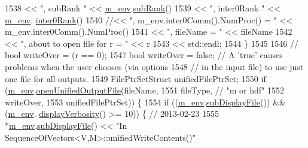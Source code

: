 \begin{DoxyCode}
1538                                   << \textcolor{stringliteral}{", subRank "}        << \hyperlink{class_q_u_e_s_o_1_1_base_vector_sequence_a8e8824d2a63c5a43bcc6473e3a0491e8}{m\_env}.\hyperlink{class_q_u_e_s_o_1_1_base_environment_a172d52f993f1322ed45aaddf71518dbb}{subRank}()
1539                                   << \textcolor{stringliteral}{", inter0Rank "}     << \hyperlink{class_q_u_e_s_o_1_1_base_vector_sequence_a8e8824d2a63c5a43bcc6473e3a0491e8}{m\_env}.
      \hyperlink{class_q_u_e_s_o_1_1_base_environment_ae106b5bb8a80b655b88b3a26b1e7c185}{inter0Rank}()
1540                                 \textcolor{comment}{//<< ", m\_env.inter0Comm().NumProc() = " << m\_env.inter0Comm().NumProc()}
1541                                   << \textcolor{stringliteral}{", fileName = "}     << fileName
1542                                   << \textcolor{stringliteral}{", about to open file for r = "} << r
1543                                   << std::endl;
1544         \}
1545 
1546         \textcolor{comment}{// bool writeOver = (r == 0);}
1547         \textcolor{keywordtype}{bool} writeOver = \textcolor{keyword}{false}; \textcolor{comment}{// A 'true' causes problems when the user chooses (via options}
1548                                 \textcolor{comment}{// in the input file) to use just one file for all outputs.}
1549         FilePtrSetStruct unifiedFilePtrSet;
1550         \textcolor{keywordflow}{if} (\hyperlink{class_q_u_e_s_o_1_1_base_vector_sequence_a8e8824d2a63c5a43bcc6473e3a0491e8}{m\_env}.\hyperlink{class_q_u_e_s_o_1_1_base_environment_ad4dd93dbcb8d2f9ef79af9afaec00aa5}{openUnifiedOutputFile}(fileName,
1551                                         fileType, \textcolor{comment}{// "m or hdf"}
1552                                         writeOver,
1553                                         unifiedFilePtrSet)) \{
1554           \textcolor{keywordflow}{if} ((\hyperlink{class_q_u_e_s_o_1_1_base_vector_sequence_a8e8824d2a63c5a43bcc6473e3a0491e8}{m\_env}.\hyperlink{class_q_u_e_s_o_1_1_base_environment_a8a0064746ae8dddfece4229b9ad374d6}{subDisplayFile}()) && (\hyperlink{class_q_u_e_s_o_1_1_base_vector_sequence_a8e8824d2a63c5a43bcc6473e3a0491e8}{m\_env}.
      \hyperlink{class_q_u_e_s_o_1_1_base_environment_a1fe5f244fc0316a0ab3e37463f108b96}{displayVerbosity}() >= 10)) \{ \textcolor{comment}{// 2013-02-23}
1555             *\hyperlink{class_q_u_e_s_o_1_1_base_vector_sequence_a8e8824d2a63c5a43bcc6473e3a0491e8}{m\_env}.\hyperlink{class_q_u_e_s_o_1_1_base_environment_a8a0064746ae8dddfece4229b9ad374d6}{subDisplayFile}() << \textcolor{stringliteral}{"In
       SequenceOfVectors<V,M>::unifiedWriteContents()"}

\end{DoxyCode}
